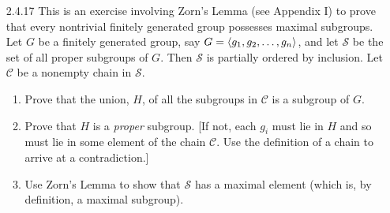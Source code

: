 \begin{enumerate}
\begin{enumerate}
               Now we are ready to prove the main problem. So let $G = \cyc{x}$
               be a noncyclic group of order $n$. Suppose first that
               $H$ is a maximal subgroup of $G$. It follows by Theorem 7 (3),
               Pg. 58, that $H = \cyc{x^r}$, where $r = n / |H|$ (so that
               $r \mid n$). Now assume to the contrary that $r$ is composite; 
               thus $r = ab$ for some integers $1 < a \le b < r$. Thus
               $x^r = (x^a)^b$ so that $\cyc{x^r} \le \cyc{x^a}$. But
               $|x^a| = n/a < n$; that is, $\cyc{x^a}$ is a proper subgroup of
               $G$, contradicting the maximality of $\cyc{x^r}$; we can thus 
               conclude that $r$ is  prime. Now suppose conversely that
               $H = \cyc{x^p}$ for some prime $p$ dividing $n$. By Exercise 
               2.4.16 (a), $\cyc{x^p} \le \cyc{x^s}$, for some maximal subgroup
               $\cyc{x^s}$ in $G$. We can assume without loss of generality that
               $s \mid n$ (Theorem 7 (3), Pg. 58). Thus by Lemma 2.4.1, $s$ must
               divide $p$, so that $s = 1$ or $s = p$; since $\cyc{x^s}$ is a
               proper subgroup, it follows that $s = p$. That is $\cyc{x^p}$ is
               maximal. \qed
     \end{enumerate}
   \item[2.4.17]  This is an exercise involving Zorn's Lemma (see Appendix I) to
                  prove that every nontrivial finitely generated group possesses
                  maximal subgroups. Let $G$ be a finitely generated group, say
                  $G = \langle g_1, g_2, \ldots, g_n \rangle$, and let $\mathcal{S}$ be
                  the set of all proper subgroups of $G$. Then $\mathcal{S}$ is
                  partially ordered by inclusion. Let $\mathcal{C}$ be a
                  nonempty chain in $\mathcal{S}$.
                  \begin{enumerate}
                     \item Prove that the union, $H$, of all the subgroups in
                           $\mathcal{C}$ is a subgroup of $G$.
                     \item Prove that $H$ is a \textit{proper} subgroup. [If
                           not, each $g_i$ must lie in $H$ and so must lie in
                           some element of the chain $\mathcal{C}$. Use the
                           definition of a chain to arrive at a contradiction.]
                     \item Use Zorn's Lemma to show that $\mathcal{S}$ has a
                           maximal element (which is, by definition, a maximal
                           subgroup).
                  \end{enumerate}


\end{enumerate}
